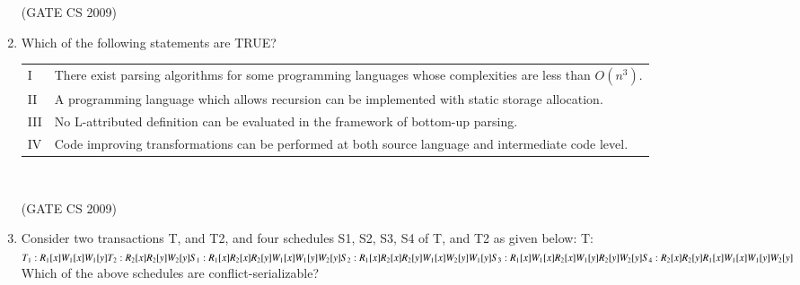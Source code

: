 \documentclass[a4paper, 11pt]{article}
\begin{document}
\begin{enumerate}
    \hfill (GATE CS 2009)
    
    \item Which of the following statements are TRUE?\\
    \begin{tabular}{ll}
        I & There exist parsing algorithms for some programming languages whose complexities are less than $O(n^3)$. \\
        II & A programming language which allows recursion can be implemented with static storage allocation.\\
        III & No L-attributed definition can be evaluated in the framework of bottom-up parsing. \\
        IV & Code improving transformations can be performed at both source language and intermediate code level.
    \end{tabular}\\
    \begin{enumerate}
    \end{enumerate}

    \hfill (GATE CS 2009)

    \item Consider two transactions T, and T2, and four schedules S1, S2, S3, S4 of T, and T2 as given below: T: \\
    $
    T_1: R_1[x] W_1[x] W_1[y]\\
    T_2: R_2[x] R_2[y] W_2[y]\\
    S_1: R_1[x] R_2[x] R_2[y] W_1[x] W_1[y] W_2[y] \\
    S_2: R_1[x] R_2[x] R_2[y] W_1[x] W_2[y] W_1[y]\\
    S_3: R_1[x] W_1[x] R_2[x] W_1[y] R_2[y] W_2[y]\\
    S_4: R_2[x] R_2[y] R_1[x] W_1[x] W_1[y] W_2[y]\\
    $
    Which of the above schedules are conflict-serializable?\\
    \begin{enumerate}
    \end{enumerate}


\end{enumerate}
\end{document}
